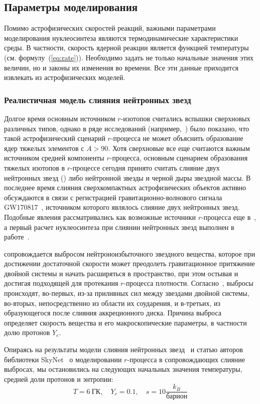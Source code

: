 \subsection{Параметры моделирования}
Помимо астрофизических скоростей реакций, важными параметрами моделирования нуклеосинтеза являются термодинамические характеристики среды. В частности, скорость ядерной реакции является функцией температуры (см. формулу~(\ref{eq:rate})). Необходимо задать не только начальные значения этих величин, но и законы их изменения во времени. Все эти данные приходится извлекать из астрофизических моделей.

\subsubsection{Реалистичная модель слияния нейтронных звезд}
\label{sec:nsm}
Долгое время основным источником $r$-изотопов считались вспышки сверхновых различных типов, однако в ряде исследований (например,~\cite{arcones2007,roberts2010}) было показано, что такой астрофизический сценарий $r$-процесса не может объяснить образование ядер тяжелых элементов с $A > 90$. Хотя сверхновые все еще считаются важным источником средней компоненты $r$-процесса, основным сценарием образования тяжелых изотопов в $r$-процессе сегодня принято считать слияние двух нейтронных звезд (\nsm) либо нейтронной звезды и черной дыры звездной массы. В последнее время слияния сверхкомпактных астрофизических объектов активно обсуждаются в связи с регистрацией гравитационно-волнового сигнала GW170817~\cite{abbott2017}, источником которого являлось слияние двух нейтронных звезд. Подобные явления рассматривались как возможные источники $r$-процесса еще в~\cite{lattimer1974,lattimer1976,symbalisty1982}, а первый расчет нуклеосинтеза при слиянии нейтронных звезд выполнен в работе~\cite{freiberghaus1999}.

\nsm{} сопровождается выбросом нейтроноизбыточного звездного вещества, которое при достижении достаточной скорости может преодолеть гравитационное притяжение двойной системы и начать расширяться в пространство, при этом остывая и достигая подходящей для протекания $r$-процесса плотности. Согласно~\cite{lippuner2015}, выбросы происходят, во-первых, из-за приливных сил между звездами двойной системы, во-вторых, непосредственно из области их соударения, и в-третьих, из образующегося после слияния аккреционного диска. Причина выброса определяет скорость вещества и его макроскопические параметры, в частности долю протонов $Y_e$.

Опираясь на результаты модели слияния нейтронных звезд~\cite{korobkin2012} и статью авторов библиотеки SkyNet~\cite{lippuner2015} о моделировании $r$-процесса в сопровождающих слияние выбросах, мы остановились на следующих начальных значения температуры, средней доли протонов и энтропии:
\begin{equation}
\displaystyle
T = 6~\text{ГК},\quad Y_e = 0.1,\quad s = 10 \frac{k_B}{\text{барион}}
\end{equation}

